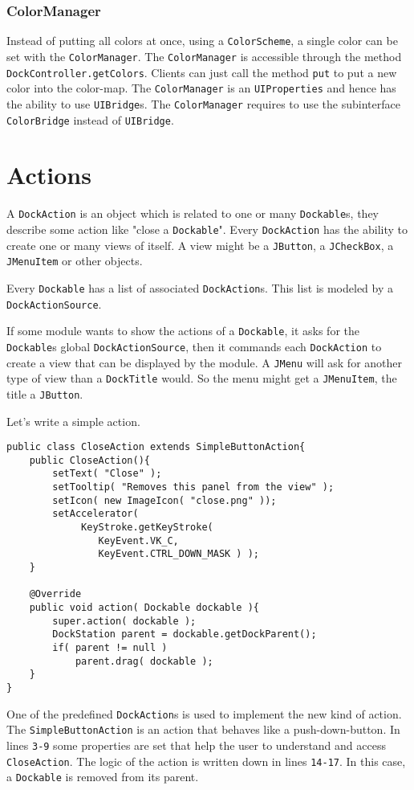 \documentclass[a4paper,10pt]{article}
\newcommand{\src}[1]{\lstinline[basicstyle=\normalsize\ttfamily,keywordstyle=\normalsize\ttfamily,identifierstyle=\normalsize\ttfamily]|#1|}
\begin{document}
\subsubsection{ColorManager}
Instead of putting all colors at once, using a \src{ColorScheme}, a single color can be set with the \src{ColorManager}. The \src{ColorManager} is accessible through the method \src{DockController.getColors}. Clients can just call the method \src{put} to put a new color into the color-map. The \src{ColorManager} is an \src{UIProperties} and hence has the ability to use \src{UIBridge}s. The \src{ColorManager} requires to use the subinterface \src{ColorBridge} instead of \src{UIBridge}.

\section{Actions}
A \src{DockAction} is an object which is related to one or many \src{Dockable}s, they describe some action like "close a \src{Dockable}". Every \src{DockAction} has the ability to create one or many views of itself. A view might be a \src{JButton}, a \src{JCheckBox}, a \src{JMenuItem} or other objects.

Every \src{Dockable} has a list of associated \src{DockAction}s. This list is modeled by a \src{DockActionSource}. 

If some module wants to show the actions of a \src{Dockable}, it asks for the \src{Dockable}s global \src{DockActionSource}, then it commands each \src{DockAction} to create a view that can be displayed by the module. A \src{JMenu} will ask for another type of view than a \src{DockTitle} would. So the menu might get a \src{JMenuItem}, the title a \src{JButton}.

Let's write a simple action.
\begin{lstlisting}
public class CloseAction extends SimpleButtonAction{
	public CloseAction(){
		setText( "Close" );
		setTooltip( "Removes this panel from the view" );
		setIcon( new ImageIcon( "close.png" ));
		setAccelerator(
			 KeyStroke.getKeyStroke(
				KeyEvent.VK_C,
				KeyEvent.CTRL_DOWN_MASK ) );
	}

	@Override
	public void action( Dockable dockable ){
		super.action( dockable );
		DockStation parent = dockable.getDockParent();
		if( parent != null )
			parent.drag( dockable );
	}
}
\end{lstlisting}
One of the predefined \src{DockAction}s is used to implement the new kind of action. The \src{SimpleButtonAction} is an action that behaves like a push-down-button. In lines \src{3-9} some properties are set that help the user to understand and access \src{CloseAction}. The logic of the action is written down in lines \src{14-17}. In this case, a \src{Dockable} is removed from its parent.
\end{document}
